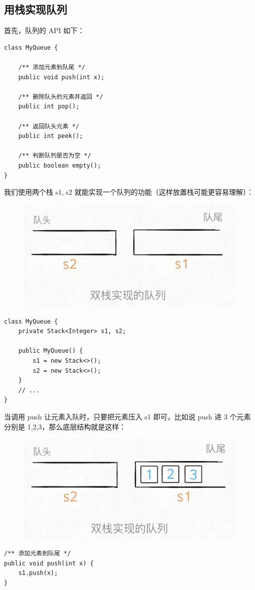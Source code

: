 \documentclass[12pt]{article}
\begin{document}
\subsection{用栈实现队列}
首先，队列的 API 如下：
\begin{lstlisting}
class MyQueue {
    
    /** 添加元素到队尾 */
    public void push(int x);
    
    /** 删除队头的元素并返回 */
    public int pop();
    
    /** 返回队头元素 */
    public int peek();
    
    /** 判断队列是否为空 */
    public boolean empty();
}
\end{lstlisting}

我们使用两个栈 s1, s2 就能实现一个队列的功能（这样放置栈可能更容易理解）：
\begin{figure}[H]
    \centering
    \includegraphics[width=.5\textwidth]{fig/Queue_Stack_Implementation_1.png}
\end{figure}

\begin{lstlisting}
class MyQueue {
    private Stack<Integer> s1, s2;
    
    public MyQueue() {
        s1 = new Stack<>();
        s2 = new Stack<>();
    }
    // ...
}
\end{lstlisting}

当调用 push 让元素入队时，只要把元素压入 s1 即可，比如说 push 进 3 个元素分别是 1,2,3，那么底层结构就是这样：
\begin{figure}[H]
    \centering
    \includegraphics[width=.5\textwidth]{fig/Queue_Stack_Implementation_2.png}
\end{figure}

\begin{lstlisting}
/** 添加元素到队尾 */
public void push(int x) {
    s1.push(x);
}
\end{lstlisting}
\end{document}
